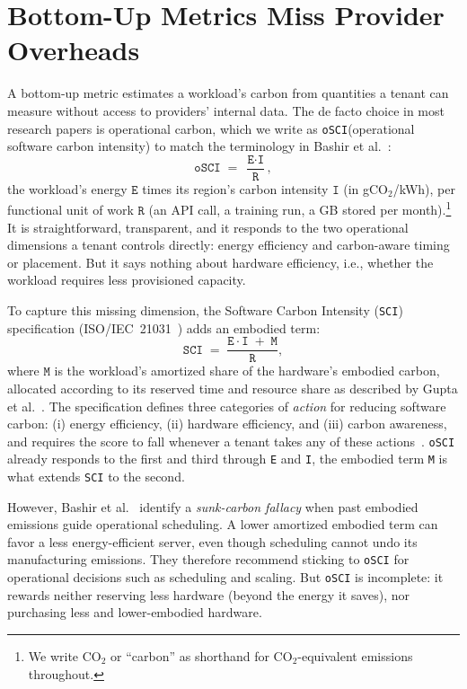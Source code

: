 \documentclass[sigconf,screen,nonacm]{acmart}
\newcommand{\SCI}{\texttt{SCI}\xspace}
\newcommand{\OSCI}{\texttt{oSCI}\xspace}
\newcommand{\E}{\texttt{E}\xspace}
\newcommand{\I}{\texttt{I}\xspace}
\newcommand{\M}{\texttt{M}\xspace}
\newcommand{\R}{\texttt{R}\xspace}
\begin{document}
 \section{Bottom-Up Metrics Miss Provider Overheads}
\label{sec:background}

A bottom-up metric estimates a workload's carbon from quantities a tenant can measure without access to providers' internal data.
The de facto choice in most research papers is operational carbon, which we write as \OSCI (operational software carbon intensity) to match the terminology in Bashir et al.~\cite{bashir2024}:
\[
\OSCI \;=\; \frac{\E \cdot \I}{\R},
\]
the workload's energy $\E$ times its region's carbon intensity $\I$ (in gCO$_2$/kWh), per functional unit of work $\R$ (an API call, a training run, a GB stored per month).\footnote{We write CO$_2$ or ``carbon'' as shorthand for CO$_2$-equivalent emissions throughout.}
It is straightforward, transparent, and it responds to the two operational dimensions a tenant controls directly: energy efficiency and carbon-aware timing or placement.
But it says nothing about hardware efficiency, i.e., whether the workload requires less provisioned capacity.

To capture this missing dimension, the Software Carbon Intensity (\SCI) specification (ISO/IEC~21031~\cite{sci-spec}) adds an embodied term:
\[
\SCI \;=\; \frac{\E \cdot \I \;+\; \M}{\R},
\]
where $\M$ is the workload's amortized share of the hardware's embodied carbon, allocated according to its reserved time and resource share as described by Gupta et al.~\cite{gupta2022act}.
The specification defines three categories of \emph{action} for reducing software carbon: (i) energy efficiency, (ii) hardware efficiency, and (iii) carbon awareness, and requires the score to fall whenever a tenant takes any of these actions~\cite{sci-spec}.
\OSCI already responds to the first and third through \E and \I, the embodied term \M is what extends \SCI to the second.

However, Bashir et al.~\cite{bashir2024} identify a \emph{sunk-carbon fallacy} when past embodied emissions guide operational scheduling.
A lower amortized embodied term can favor a less energy-efficient server, even though scheduling cannot undo its manufacturing emissions.
They therefore recommend sticking to \OSCI for operational decisions such as scheduling and scaling.
But \OSCI is incomplete: it rewards neither reserving less hardware (beyond the energy it saves), nor purchasing less and lower-embodied hardware.
\end{document}

